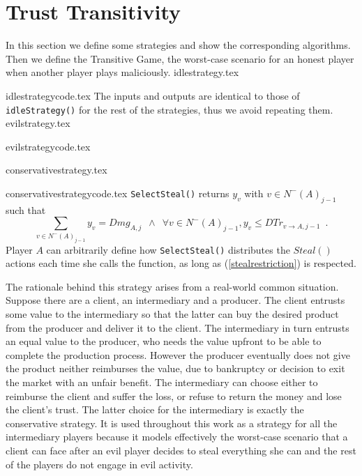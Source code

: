 \section{Trust Transitivity}
  In this section we define some strategies and show the corresponding algorithms. Then we define the Transitive Game, the
  worst-case scenario for an honest player when another player plays maliciously.
  {idlestrategy.tex}

  {idlestrategycode.tex}
  The inputs and outputs are identical to those of \texttt{idleStrategy()} for the rest of the strategies, thus we avoid
  repeating them.
  {evilstrategy.tex}

  {evilstrategycode.tex}

  {conservativestrategy.tex}

  {conservativestrategycode.tex}
  \texttt{SelectSteal()} returns $y_v$ with $v \in N^{-}\left(A\right)_{j-1}$ such that
  \begin{equation}
  \label{stealrestriction}
     \sum\limits_{v \in N^{-}\left(A\right)_{j-1}}y_v = Dmg_{A, j} \enspace \wedge \enspace \forall v \in N^{-}\left(A\right)_{j-1},
     y_v \leq DTr_{v \rightarrow A, j-1} \enspace.
  \end{equation}
  Player $A$ can arbitrarily define how \texttt{SelectSteal()} distributes the $Steal\left(\right)$ actions
  each time she calls the function, as long as (\ref{stealrestriction}) is respected. 

  The rationale behind this strategy arises from a real-world common situation. Suppose there are a client, an
  intermediary and a producer. The client entrusts some value to the intermediary so that the latter can buy the desired
  product from the producer and deliver it to the client. The intermediary in turn entrusts an equal value to the
  producer, who needs the value upfront to be able to complete the production process. However the producer eventually
  does not give the product neither reimburses the value, due to bankruptcy or decision to exit the market with an unfair
  benefit. The intermediary can choose either to reimburse the client and suffer the loss, or refuse to return the money
  and lose the client's trust. The latter choice for the intermediary is exactly the conservative strategy. It is used
  throughout this work as a strategy for all the intermediary players because it models effectively the worst-case
  scenario that a client can face after an evil player decides to steal everything she can and the rest of the players do
  not engage in evil activity.

